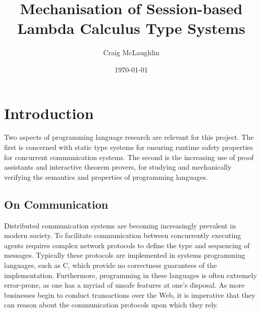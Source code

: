 \documentclass{mprop}
\begin{document}

\title{Mechanisation of Session-based Lambda Calculus Type Systems}
\author{Craig McLaughlin}
\date{\today}
\maketitle


\tableofcontents
\newpage

\section{Introduction}\label{intro}

Two aspects of programming language research are relevant for this project. The first is concerned with static type systems for ensuring runtime safety properties for concurrent communication systems. The second is the increasing use of proof assistants and interactive theorem provers, for studying and mechanically verifying the semantics and properties of programming languages.

\subsection{On Communication}

Distributed communication systems are becoming increasingly prevalent in modern society. To facilitate communication between concurrently executing agents requires complex network protocols to define the type and sequencing of messages. Typically these protocols are implemented in systems programming languages, such as C, which provide no correctness guarantees of the implementation. Furthermore, programming in these languages is often extremely error-prone, as one has a myriad of unsafe features at one's disposal. As more businesses begin to conduct transactions over the Web, it is imperative that they can reason about the communication protocols upon which they rely.
\end{document}
